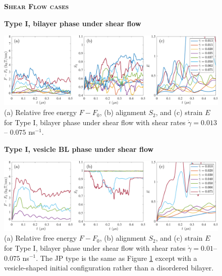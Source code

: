\begin{figure}[h!]
\begin{center}
\textbf{\textsc{Shear Flow cases}}\par\medskip
\textbf{Type I, bilayer phase under shear flow}\par\medskip
\includegraphics[width=\textwidth]{FigureS1.pdf}
\end{center}
\caption{(a) Relative free energy $F - F_0$, (b) alignment $S_2$, and
  (c) strain $E$ for Type I, bilayer phase under shear flow with shear
  rates $\dot\gamma=0.013$ -- $0.075$ ns$^{-1}$.
}
\label{fig:ulshraw}
\end{figure}


\begin{figure}[h!]
\begin{center}
\textbf{Type I, vesicle BL phase under shear flow}\par\medskip
\includegraphics[width=\textwidth]{FigureS2.pdf}
\end{center}
\caption{(a) Relative free energy $F - F_0$, (b) alignment $S_2$, and
  (c) strain $E$ for Type I, bilayer phase under shear flow with shear
  rates $\dot\gamma=0.01$--$0.075$ ns$^{-1}$. The JP type is the same as
  Figure \ref{fig:ulshraw} except with a vesicle-shaped initial
  configuration rather than a disordered bilayer.
}
\label{fig:veshraw}
\end{figure}


